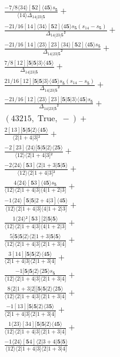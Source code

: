 \documentclass[varwidth, border=5pt]{standalone}
\begin{document}
\begin{my}
$\begin{gathered}
\scriptscriptstyle\frac{-7/8⟨34⟩[𝟓2]⟨4𝟓⟩s_{𝟓}}{⟨14⟩Δ_{14|23|𝟓}} +\\
\scriptscriptstyle\frac{-21/16[14]⟨34⟩[𝟓2]⟨4𝟓⟩s_{𝟓}(s_{14}-s_{𝟓})}{Δ_{14|23|𝟓}²} +\\
\scriptscriptstyle\frac{-21/16[14]⟨23⟩[23]⟨34⟩[𝟓2]⟨4𝟓⟩s_{𝟓}}{Δ_{14|23|𝟓}²} +\\
\scriptscriptstyle\frac{7/8[12][𝟓|𝟓|3⟩⟨4𝟓⟩}{Δ_{14|23|𝟓}} +\\
\scriptscriptstyle\frac{21/16[12][𝟓|𝟓|3⟩⟨4𝟓⟩s_{𝟓}(s_{14}-s_{𝟓})}{Δ_{14|23|𝟓}²} +\\
\scriptscriptstyle\frac{-21/16[12]⟨23⟩[23][𝟓|𝟓|3⟩⟨4𝟓⟩s_{𝟓}}{Δ_{14|23|𝟓}²} +\\
\scriptscriptstyle(43215,\;\text{True},\;-) +\\
\scriptscriptstyle\frac{2[13][𝟓|𝟓|2⟩⟨4𝟓⟩}{⟨2|1+4|3]²} +\\
\scriptscriptstyle\frac{-2[23]⟨24⟩[𝟓|𝟓|2⟩⟨2𝟓⟩}{⟨12⟩⟨2|1+4|3]²} +\\
\scriptscriptstyle\frac{-2⟨24⟩[𝟓3]⟨2|1+3|𝟓|𝟓⟩}{⟨12⟩⟨2|1+4|3]²} +\\
\scriptscriptstyle\frac{4⟨24⟩[𝟓3]⟨4𝟓⟩s_{𝟓}}{⟨12⟩⟨2|1+4|3]⟨4|1+2|3]} +\\
\scriptscriptstyle\frac{-1⟨24⟩[𝟓|𝟓|2+4|3]⟨4𝟓⟩}{⟨12⟩⟨2|1+4|3]⟨4|1+2|3]} +\\
\scriptscriptstyle\frac{1⟨24⟩²[𝟓3][2|𝟓|𝟓⟩}{⟨12⟩⟨2|1+4|3]⟨4|1+2|3]} +\\
\scriptscriptstyle\frac{5[𝟓|𝟓|2⟩⟨2|1+3|𝟓|𝟓⟩}{⟨12⟩⟨2|1+4|3]⟨2|1+3|4]} +\\
\scriptscriptstyle\frac{3[14][𝟓|𝟓|2⟩⟨4𝟓⟩}{⟨2|1+4|3]⟨2|1+3|4]} +\\
\scriptscriptstyle\frac{-1[𝟓|𝟓|2⟩⟨2𝟓⟩s_{𝟓}}{⟨12⟩⟨2|1+4|3]⟨2|1+3|4]} +\\
\scriptscriptstyle\frac{8⟨2|1+3|2][𝟓|𝟓|2⟩⟨2𝟓⟩}{⟨12⟩⟨2|1+4|3]⟨2|1+3|4]} +\\
\scriptscriptstyle\frac{-1[13][𝟓|𝟓|2⟩⟨3𝟓⟩}{⟨2|1+4|3]⟨2|1+3|4]} +\\
\scriptscriptstyle\frac{1⟨23⟩[34][𝟓|𝟓|2⟩⟨4𝟓⟩}{⟨12⟩⟨2|1+4|3]⟨2|1+3|4]} +\\
\scriptscriptstyle\frac{-1⟨24⟩[𝟓4]⟨2|3+4|𝟓|𝟓⟩}{⟨12⟩⟨2|1+4|3]⟨2|1+3|4]} \phantom{+}
\end{gathered}$
\end{my}
\end{document}
